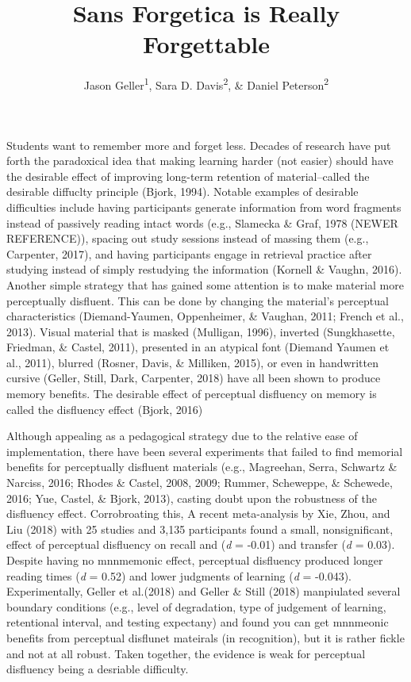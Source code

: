 \documentclass[doc]{apa6}
\affiliation{
\vspace{0.5cm}
\textsuperscript{1} University of Iowa\\\textsuperscript{2} Skidmore College}
\title{Sans Forgetica is Really Forgettable}
\author{Jason Geller\textsuperscript{1}, Sara D. Davis\textsuperscript{2}, \& Daniel Peterson\textsuperscript{2}}
\date{}
\begin{document}
\maketitle

Students want to remember more and forget less. Decades of research have put forth the paradoxical idea that making learning harder (not easier) should have the desirable effect of improving long-term retention of material--called the desirable diffuclty principle (Bjork, 1994). Notable examples of desirable difficulties include having participants generate information from word fragments instead of passively reading intact words (e.g., Slamecka \& Graf, 1978 (NEWER REFERENCE)), spacing out study sessions instead of massing them (e.g., Carpenter, 2017), and having participants engage in retrieval practice after studying instead of simply restudying the information (Kornell \& Vaughn, 2016). Another simple strategy that has gained some attention is to make material more perceptually disfluent. This can be done by changing the material's perceptual characteristics (Diemand-Yaumen, Oppenheimer, \& Vaughan, 2011; French et al., 2013). Visual material that is masked (Mulligan, 1996), inverted (Sungkhasette, Friedman, \& Castel, 2011), presented in an atypical font (Diemand Yaumen et al., 2011), blurred (Rosner, Davis, \& Milliken, 2015), or even in handwritten cursive (Geller, Still, Dark, Carpenter, 2018) have all been shown to produce memory benefits. The desirable effect of perceptual disfluency on memory is called the disfluency effect (Bjork, 2016)

Although appealing as a pedagogical strategy due to the relative ease of implementation, there have been several experiments that failed to find memorial benefits for perceptually disfluent materials (e.g., Magreehan, Serra, Schwartz \& Narciss, 2016; Rhodes \& Castel, 2008, 2009; Rummer, Scheweppe, \& Schewede, 2016; Yue, Castel, \& Bjork, 2013), casting doubt upon the robustness of the disfluency effect. Corrobroating this, A recent meta-analysis by Xie, Zhou, and Liu (2018) with 25 studies and 3,135 participants found a small, nonsignificant, effect of perceptual disfluency on recall and (\emph{d} = -0.01) and transfer (\emph{d} = 0.03). Despite having no mnnmemonic effect, perceptual disfluency produced longer reading times (\emph{d} = 0.52) and lower judgments of learning (\emph{d} = -0.043). Experimentally, Geller et al.(2018) and Geller \& Still (2018) manpiulated several boundary conditions (e.g., level of degradation, type of judgement of learning, retentional interval, and testing expectany) and found you can get mnnmeonic benefits from perceptual disflunet mateirals (in recognition), but it is rather fickle and not at all robust. Taken together, the evidence is weak for perceptual disfluency being a desriable difficulty.
\end{document}
